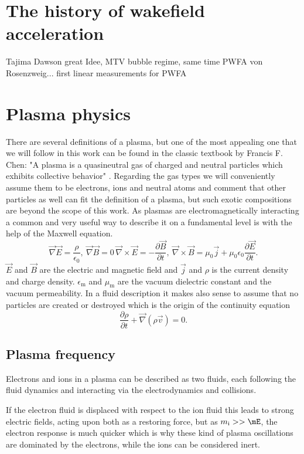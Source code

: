 \section{The history of wakefield acceleration}
Tajima Dawson great Idee, MTV bubble regime, same time PWFA von Rosenzweig... first linear measurements for PWFA
\section{Plasma physics}
There are several definitions of a plasma, but one of the most appealing one that we will follow in this work can be found in the classic 
textbook by Francis F. Chen:
"A plasma is a quasineutral gas of charged and neutral particles which
exhibits collective behavior" \cite{Chen_book_Plasma}.
Regarding the gas types we will conveniently assume them to be electrons, ions and neutral atoms and comment that other particles as well can fit the definition of a plasma, but such exotic compositions are beyond the scope of this work.
As plasmas are electromagnetically interacting a common and very useful way to describe it on a fundamental level is with the help of the Maxwell equation.
\begin{equation}
\label{eqn:Maxwell}
\vec{\nabla} \vec{E} = \frac{\rho}{\epsilon_0},\	\vec{\nabla}\vec{B} =0\,	\vec{\nabla}\times\vec{E}=-\frac{\partial \vec{B}}{\partial t},\ 
 \vec{\nabla}\times \vec{B}=\mu_0\vec{j}+\mu_0\epsilon_0\frac{\partial \vec{E}}{\partial t}.
\end{equation}
$\vec{E}$ and $\vec{B}$ are the electric and magnetic field and  $\vec{j}$ and $\rho$ is the current density and charge density.
$\epsilon_\mathrm{m}$ and $\mu_\mathrm{m}$ are the vacuum  dielectric constant and the vacuum permeability.
In a fluid description it makes also sense to assume that no particles are created or destroyed which is the origin of the 
continuity equation 
\begin{equation}
\frac{\partial \rho}{\partial t} + \vec{\nabla}(\rho \vec{v})=0.
\end{equation}




\subsection*{Plasma frequency}
Electrons and ions in a plasma can be described as two fluids, each following the fluid dynamics and interacting via the electrodynamics and collisions.

If the electron fluid is displaced with respect to the ion fluid this leads to strong electric fields, acting upon both as a restoring force, but as $m_\mathrm{i}>>\mE$, the electron response is much quicker which is why these kind of plasma oscillations are dominated by the electrons, while the ions can be considered inert.

